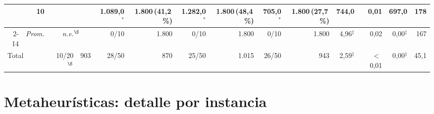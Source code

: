 \documentclass[11pt,a4paper]{article}
\begin{document}
\begin{table}[htbp]
{\begin{tabular}{rr rr rr rr rr rr rr}
 & 10 &  &  & 1.089{,}0$^{*}$ & 1.800\,{\scriptsize(41{,}2\,\%)} & 1.282{,}0$^{*}$ & 1.800\,{\scriptsize(48{,}4\,\%)} & 705{,}0$^{*}$ & 1.800\,{\scriptsize(27{,}7\,\%)} & 744{,}0 & 0{,}01 & 697{,}0 & 178 \\
\cmidrule(l){2-14}
 & \emph{Prom.} & \multicolumn{2}{c}{\textit{n.e.}$^{\S}$} & 0/10 & 1.800 & 0/10 & 1.800 & 0/10 & 1.800 & 4{,}96$^{\ddagger}$ & 0{,}02 & 0{,}00$^{\ddagger}$ & 167 \\
\midrule
\multicolumn{2}{l}{Total} & 10/20$^{\S}$ & 903 & 28/50 & 870 & 25/50 & 1.015 & 26/50 & 943 & 2{,}59$^{\ddagger}$ & $<$\,0{,}01 & 0{,}00$^{\ddagger}$ & 45{,}1 \\
\bottomrule
\end{tabular}%
}
\end{table}

\clearpage
\section{Metaheurísticas: detalle por instancia}
\label{anx:metaheuristicas}
\end{document}
